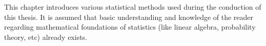 
This chapter introduces various statistical methods used during the conduction of this thesis. It is assumed that basic understanding and knowledge of the reader regarding mathematical foundations of statistics (like linear algebra, probability theory, etc) already exists.
